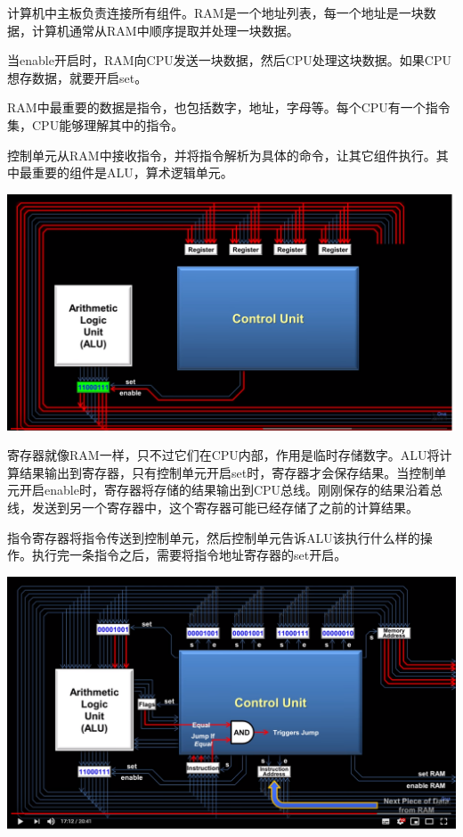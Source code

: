 \documentclass{ctexart}
\begin{document}
	计算机中主板负责连接所有组件。RAM是一个地址列表，每一个地址是一块数据，计算机通常从RAM中顺序提取并处理一块数据。
	
	当enable开启时，RAM向CPU发送一块数据，然后CPU处理这块数据。如果CPU想存数据，就要开启set。
	
	RAM中最重要的数据是指令，也包括数字，地址，字母等。每个CPU有一个指令集，CPU能够理解其中的指令。
	
	控制单元从RAM中接收指令，并将指令解析为具体的命令，让其它组件执行。其中最重要的组件是ALU，算术逻辑单元。
	
	\includegraphics[scale=0.5]{CPU1}
	
	寄存器就像RAM一样，只不过它们在CPU内部，作用是临时存储数字。ALU将计算结果输出到寄存器，只有控制单元开启set时，寄存器才会保存结果。当控制单元开启enable时，寄存器将存储的结果输出到CPU总线。刚刚保存的结果沿着总线，发送到另一个寄存器中，这个寄存器可能已经存储了之前的计算结果。
	
	指令寄存器将指令传送到控制单元，然后控制单元告诉ALU该执行什么样的操作。执行完一条指令之后，需要将指令地址寄存器的set开启。
	
	\includegraphics[scale=0.5]{CPU2}
\end{document}
